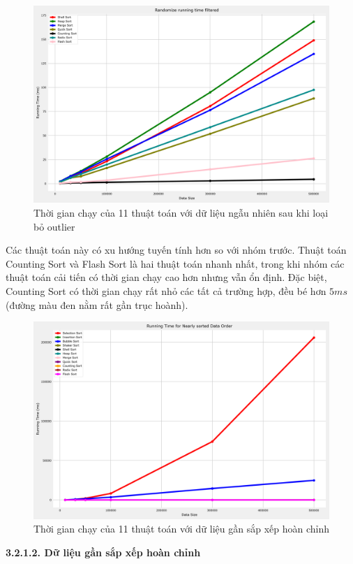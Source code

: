 \begin{figure}[H]
    \centering
    \includegraphics[width=\textwidth]{experimental_result/images/randomize_running_time_filtered.png}
    \caption{Thời gian chạy của 11 thuật toán với dữ liệu ngẫu nhiên sau khi loại bỏ outlier}
    \label{fig:randomize_running_time_filtered}
\end{figure}

Các thuật toán này có xu hướng tuyến tính hơn so với nhóm trước. Thuật toán Counting Sort và Flash Sort là hai thuật toán nhanh nhất, trong khi nhóm các thuật toán cải tiến có thời gian chạy cao hơn nhưng vẫn ổn định. Đặc biệt, Counting Sort có thời gian chạy rất nhỏ các tất cả trường hợp, đều bé hơn $5 ms$ (đường màu đen nằm rất gần trục hoành).




\begin{figure}[H]
    \centering
    \includegraphics[width=\textwidth]{experimental_result/images/nearly_sorted_running_time.png}
    \caption{Thời gian chạy của 11 thuật toán với dữ liệu gần sắp xếp hoàn chỉnh}
    \label{fig:nearly_sorted_running_time}
\end{figure}
\textbf{3.2.1.2. Dữ liệu gần sắp xếp hoàn chỉnh}


